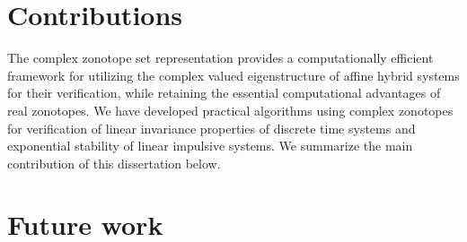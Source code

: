 \section{Contributions}
The complex zonotope set representation provides a computationally
efficient framework for utilizing the complex valued eigenstructure of
affine hybrid systems for their verification, while retaining the
essential computational advantages of real zonotopes.  We have
developed practical algorithms using complex zonotopes for
verification of linear invariance properties of discrete time systems
and exponential stability of linear impulsive systems.  We summarize
the main contribution of this dissertation below.
%


\section{Future work}



